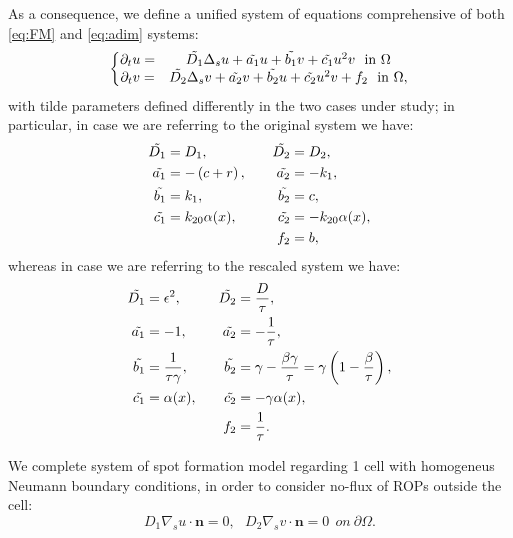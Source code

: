As a consequence, we define a unified system of equations comprehensive of both \eqref{eq:FM} and \eqref{eq:adim} systems:
\begin{equation} \label{eq:final}
\left\lbrace
\begin{matrix}
\partial_t u = & \Tilde{D_1} \Delta_s u + \Tilde{a_1} u + \Tilde{b_1} v + \Tilde{c_1} u^2 v \ \ \text{in} \ \Omega\\
\partial_t v = & \Tilde{D_2} \Delta_s v + \Tilde{a_2} v + \Tilde{b_2} u + \Tilde{c_2} u^2 v + f_2 \ \ \text{in} \ \Omega,
\end{matrix}
\right.
\end{equation}
with tilde parameters defined differently in the two cases under study; in particular, in case we are referring to the original system we have:
\begin{equation} \label{eq:coeffFM} \begin{aligned}
    \Tilde{D_1} & = D_1, \ \ \ & \Tilde{D_2}  & = D_2, \\
    \Tilde{a_1} & =  - \left(c+r\right), \ \ \ & \Tilde{a_2}  & = - k_1,  \\
    \Tilde{b_1} & = k_1, \ & \Tilde{b_2} & = c, \\
    \Tilde{c_1} & = k_{20} \alpha(x), \ \ & \Tilde{c_2} & =  - k_{20} \alpha(x), \\
    &  & f_2 & = b,
\end{aligned}\end{equation}
whereas in case we are referring to the rescaled system we have:
\begin{equation} \label{eq:coeffadim} \begin{aligned}
    \Tilde{D_1} & = \epsilon^2, \ \ \ & \Tilde{D_2}  & = \frac{D}{\tau}, \\
    \Tilde{a_1} & =  - 1, \ \ \ & \Tilde{a_2}  & = - \frac{1}{\tau},  \\
    \Tilde{b_1} & = \frac{1}{\tau \gamma}, \ & \Tilde{b_2} & = \gamma - \frac{ \beta \gamma}{\tau} = \gamma \left(1 - \frac{\beta}{\tau}\right),  \\
    \Tilde{c_1} & = \alpha(x), \ \ & \Tilde{c_2} & =  - \gamma \alpha(x), \\
    &  & f_2 & = \frac{1}{\tau}.
\end{aligned}\end{equation}

We complete system of spot formation model regarding 1 cell with homogeneus Neumann boundary conditions, in order to consider no-flux of ROPs outside the cell:
\begin{equation*}
    D_1 \nabla_s u \cdot \mathbf{n} = 0, \ \ \ D_2 \nabla_s v \cdot \mathbf{n} = 0 \ \ on \ \partial \Omega.
\end{equation*}

